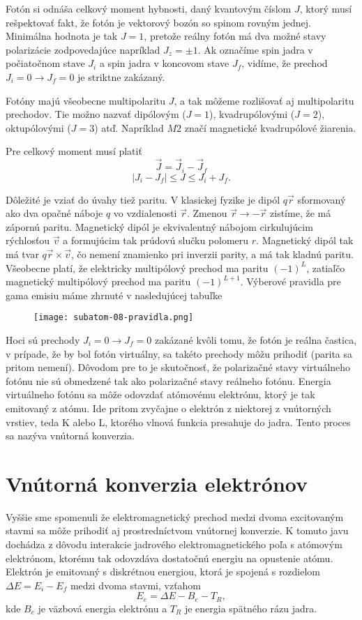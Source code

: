 \documentclass[../../main.tex]{subfiles}
\begin{document}
Fotón si odnáša celkový moment hybnosti, daný kvantovým číslom $J$, ktorý musí rešpektovať fakt, že fotón je vektorový bozón so spinom rovným jednej. Minimálna hodnota je tak $J=1$, pretože reálny fotón má dva možné stavy polarizácie zodpovedajúce napríklad $J_z=\pm 1$. Ak označíme spin jadra v počiatočnom stave $J_i$ a spin jadra v koncovom stave $J_f$, vidíme, že prechod $J_i=0 \rightarrow J_f=0$ je striktne zakázaný.

Fotóny majú všeobecne multipolaritu $J$, a tak môžeme rozlišovať aj multipolaritu prechodov. Tie možno nazvať dipólovým ($J = 1$), kvadrupólovými ($J = 2$), oktupólovými ($J = 3$) atď. Napríklad $M2$ značí magnetické kvadrupólové žiarenia.

Pre celkový moment musí platiť
$$ \vec{J} = \vec{J}_i - \vec{J}_f $$
$$ \vert J_i - J_f \vert \leq J \leq J_i + J_f. $$

Dôležité je vziať do úvahy tiež paritu. V klasickej fyzike je dipól $q\vec{r}$ sformovaný ako dva opačné náboje $q$ vo vzdialenosti $\vec{r}$. Zmenou $\vec{r} \rightarrow -\vec{r}$ zistíme, že má zápornú paritu. Magnetický dipól je ekvivalentný nábojom cirkulujúcim rýchlosťou $\vec{v}$ a formujúcim tak prúdovú slučku polomeru $r$. Magnetický dipól tak má tvar $q\vec{r} \times \vec{v}$, čo nemení znamienko pri inverzii parity, a má tak kladnú paritu.
 Všeobecne platí, že elektricky multipólový prechod ma paritu $(-1)^L$, zatiaľčo magnetický multipólový prechod ma paritu $(-1)^{L+1}$. Výberové pravidla pre gama emisiu máme zhrnuté v nasledujúcej tabuľke
\begin{figure}[!h]
\texttt{[image: subatom-08-pravidla.png]}
\centering
\end{figure}

Hoci sú prechody $J_i = 0 \rightarrow J_f = 0$ zakázané kvôli tomu, že fotón je reálna častica, v prípade, že by bol fotón virtuálny, sa takéto prechody môžu prihodiť (parita sa pritom nemení). Dôvodom pre to je skutočnosť, že polarizačné stavy virtuálneho fotónu nie sú obmedzené tak ako polarizačné stavy reálneho fotónu. Energia virtuálneho fotónu sa môže odovzdať atómovému elektrónu, ktorý je tak emitovaný z atómu. Ide pritom zvyčajne o elektrón z niektorej z vnútorných vrstiev, teda K alebo L, ktorého vlnová funkcia presahuje do jadra. Tento proces sa nazýva vnútorná konverzia.

\section{Vnútorná konverzia elektrónov}
Vyššie sme spomenuli že elektromagnetický prechod medzi dvoma excitovaným stavmi sa môže prihodiť aj prostredníctvom vnútornej konverzie. K tomuto javu dochádza z dôvodu interakcie jadrového elektromagnetického poľa s atómovým elektrónom, ktorému tak odovzdáva dostatočnú energiu na opustenie atómu. Elektrón je emitovaný s diskrétnou energiou, ktorá je spojená s rozdielom $\Delta E = E_i - E_f$ medzi dvoma stavmi, vzťahom
$$ E_e = \Delta E - B_e - T_R ,$$
kde $B_c$ je väzbová energia elektrónu a $T_R$ je energia spätného rázu jadra.
\end{document}
